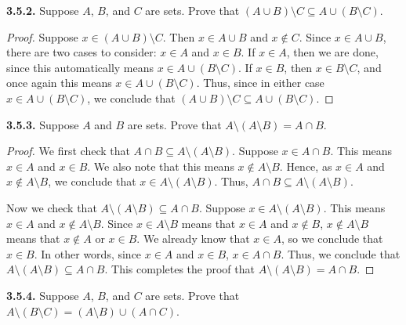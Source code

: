 \documentclass[12pt]{amsart}
\newenvironment{statement}[1]{\smallskip\noindent\color[rgb]{.6627, .3529, .6314} {\bf #1.}}{}
\theoremstyle{definition}
\theoremstyle{remark}
\begin{document}
\begin{statement}{3.5.2}
Suppose $A$, $B$, and $C$ are sets.
Prove that $(A \cup B) \setminus C \subseteq A \cup (B \setminus C)$.
\end{statement}

\begin{proof}
Suppose $x \in (A \cup B) \setminus C$.
Then $x \in A \cup B$ and $x \notin C$.
Since $x \in A \cup B$, there are two cases to consider: $x \in A$ and $x \in B$.
If $x \in A$, then we are done, since this automatically means $x \in A \cup (B \setminus C)$.
If $x \in B$, then $x \in B \setminus C$, and once again this means $x \in A \cup (B \setminus C)$.
Thus, since in either case $x \in A \cup (B \setminus C)$, we conclude that $(A \cup B) \setminus C \subseteq A \cup (B \setminus C)$.
\end{proof}


\begin{statement}{3.5.3}
Suppose $A$ and $B$ are sets.
Prove that $A \setminus (A \setminus B) = A \cap B$.
\end{statement}

\begin{proof}
We first check that $A \cap B \subseteq A \setminus (A \setminus B)$.
Suppose $x \in A \cap B$.
This means $x \in A$ and $x \in B$.
We also note that this means $x \notin A \setminus B$.
Hence, as $x \in A$ and $x \notin A \setminus B$, we conclude that $x \in A \setminus (A \setminus B)$.
Thus, $A \cap B \subseteq A \setminus (A \setminus B)$.

Now we check that $A \setminus (A \setminus B) \subseteq A \cap B$.
Suppose $x \in A \setminus (A \setminus B)$.
This means $x \in A$ and $x \notin A \setminus B$.
Since $x \in A \setminus B$ means that $x \in A$ and $x \notin B$, $x \notin A \setminus B$ means that $x \notin A$ or $x \in B$.
We already know that $x \in A$, so we conclude that $x \in B$.
In other words, since $x \in A$ and $x \in B$, $x \in A \cap B$.
Thus, we conclude that $A \setminus (A \setminus B) \subseteq A \cap B$.
This completes the proof that $A \setminus (A \setminus B) = A \cap B$.
\end{proof}


\begin{statement}{3.5.4}
Suppose $A$, $B$, and $C$ are sets.
Prove that $A \setminus (B \setminus C) = (A \setminus B) \cup (A \cap C)$.
\end{statement}
\end{document}
